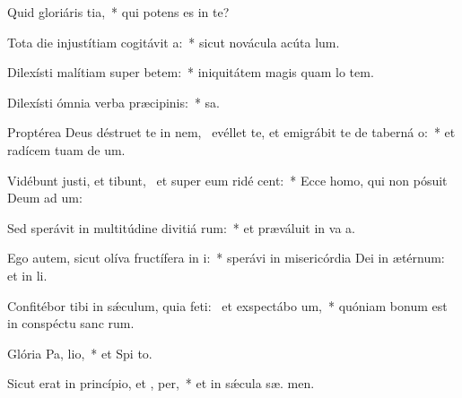 \item Quid gloriáris  tia,~* qui potens es in te?
\item Tota die injustítiam cogitávit  a:~* sicut novácula acúta  lum.
\item Dilexísti malítiam super betem:~* iniquitátem magis quam lo tem.
\item Dilexísti ómnia verba præcipinis:~*  sa.
\item Proptérea Deus déstruet te in nem,~\pscross{} evéllet te, et emigrábit te de taberná o:~* et radícem tuam de  um.
\item Vidébunt justi, et tibunt,~\pscross{} et super eum ridé  cent:~* Ecce homo, qui non pósuit Deum ad um:
\item Sed sperávit in multitúdine divitiá rum:~* et præváluit in va a.
\item Ego autem, sicut olíva fructífera in  i:~* sperávi in misericórdia Dei in ætérnum: et in  li.
\item Confitébor tibi in sǽculum, quia feti:~\pscross{} et exspectábo  um,~* quóniam bonum est in conspéctu sanc rum.
\item Glória Pa,  lio,~* et Spi to.
\item Sicut erat in princípio, et ,  per,~* et in sǽcula sæ. men.
